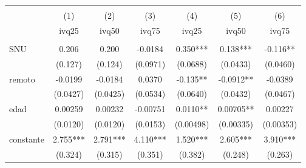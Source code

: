 \begin{tabular}{lcccccc} \hline
 &  &  \\
 &(1) & (2) & (3) & (4) & (5) & (6) \\
 & ivq25 & ivq50 & ivq75 & ivq25 & ivq50 & ivq75 \\ \hline
 &  &  &  \\
SNU & 0.206 & 0.200 & -0.0184 & 0.350*** & 0.138*** & -0.116** \\
 & (0.127) & (0.124) & (0.0971)  & (0.0688) & (0.0433) & (0.0460) \\
remoto & -0.0199 & -0.0184 & 0.0370 & -0.135** & -0.0912** & -0.0389 \\
 & (0.0427) & (0.0425) & (0.0534) & (0.0640) & (0.0432) & (0.0467)  \\
edad & 0.00259 & 0.00232 & -0.00751 & 0.0110** & 0.00705** & 0.00227\\
 & (0.0120) & (0.0120) & (0.0153) & (0.00498) & (0.00335) & (0.00353)\\
constante & 2.755*** & 2.791*** & 4.110*** & 1.520*** & 2.605*** & 3.910***\\
 & (0.324) & (0.315) & (0.351) & (0.382) & (0.248) & (0.263) \\
 \hline
\end{tabular}